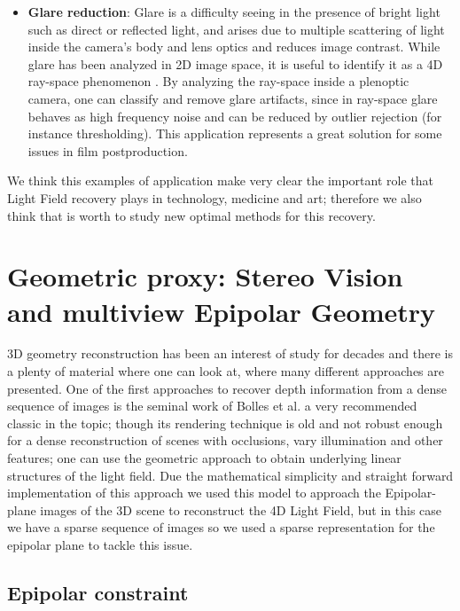 \begin{itemize}
\item \textbf{Glare reduction}: Glare is a difficulty seeing in the presence of bright light such as direct or reflected light, and arises due to multiple scattering of light inside the camera's body and lens optics and reduces image contrast. While glare has been analyzed in 2D image space, it is useful to identify it as a 4D ray-space phenomenon \cite{Raskar}. By analyzing the ray-space inside a plenoptic camera, one can classify and remove glare artifacts, since in ray-space glare behaves as high frequency noise and can be reduced by outlier rejection (for instance thresholding). This application represents a great solution for some issues in film postproduction.

\end{itemize}

We think this examples of application make very clear the important role that Light Field recovery plays in technology, medicine and art; therefore we also think that is worth to study new optimal methods for this recovery.

\section{Geometric proxy: Stereo Vision and multiview Epipolar Geometry}
\label{sec:Epi-geometry}

3D geometry reconstruction has been an interest of study for decades and there is a plenty of material where one can look at, where many different approaches are presented. One of the first approaches to recover depth information from a dense sequence of images is the seminal work of Bolles et al. \cite{Bolles} a very recommended classic in the topic; though its rendering technique is old and not robust enough for a dense reconstruction of scenes with occlusions, vary illumination and other features; one can use the geometric approach to obtain underlying linear structures of the light field. Due the mathematical simplicity and straight forward implementation of this approach we used this model to approach the Epipolar-plane images of the 3D scene to reconstruct the 4D Light Field, but in this case we have a sparse sequence of images so we used a sparse representation for the epipolar plane to tackle this issue.

\subsection{Epipolar constraint}

